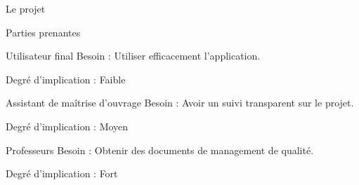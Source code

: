 \documentclass[]{article}
\begin{document}
\begin{section}{Le projet}
\begin{subsection}{Parties prenantes}
            \begin{subsubsection}{Utilisateur final}
                Besoin : Utiliser efficacement l’application.

                Degré d’implication : Faible
            \end{subsubsection}

            \begin{subsubsection}{Assistant de maîtrise d’ouvrage}
                Besoin : Avoir un suivi transparent sur le projet.

                Degré d’implication : Moyen
            \end{subsubsection}

            \begin{subsubsection}{Professeurs}
                Besoin : Obtenir des documents de management de qualité.

                Degré d’implication : Fort
            \end{subsubsection}
        \end{subsection}
    \end{section}
\end{document}

